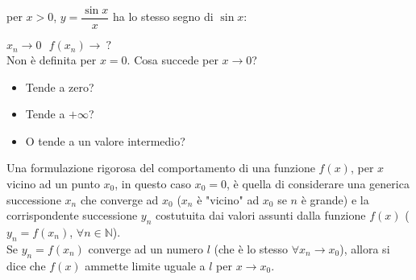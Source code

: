 \documentclass[../../main.tex]{subfiles}
\begin{document}
\begin{center}
\end{center}
per $x > 0$, $y = \dfrac{\sin x}{x}$ ha lo stesso segno di $\sin x$:
\begin{center}
\end{center}
$x_n \to 0 \ \ \ f(x_n) \to \ ?$\\
Non è definita per $x = 0$. Cosa succede per $x \to 0$?\\
\begin{itemize}
    \item Tende a zero?
    \item Tende a $+\infty$?
    \item O tende a un valore intermedio?
\end{itemize}
Una formulazione rigorosa del comportamento di una funzione $f(x)$, per $x$ vicino ad un punto $x_0$,
in questo caso $x_0 = 0$, è quella di considerare una generica successione $x_n$ che converge ad $x_0$
($x_n$ è "vicino" ad $x_0$ se $n$ è grande) e la corrispondente successione $y_n$ costutuita dai valori assunti dalla funzione $f(x)$ ($y_n = f(x_n)$, $\forall n\in \mathbb{N}$).\\
Se $y_n = f(x_n)$ converge ad un numero $l$ (che è lo stesso $\forall x_n \to x_0$), allora si dice che $f(x)$ ammette limite
uguale a $l$ per $x \to x_0$.\\
\end{document}
